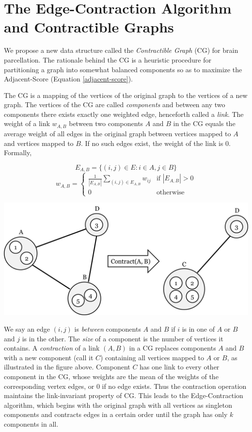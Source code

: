 \section{The Edge-Contraction Algorithm and Contractible Graphs}

We propose a new data structure called the \textit{Contractible Graph}
(CG) for brain parcellation. The rationale behind the CG is a heuristic
procedure for partitioning a graph into somewhat balanced components
so as to maximize the Adjacent-Score (Equation \ref{adjacent-score}).

The CG is a mapping of the vertices of the original graph to the
vertices of a new graph. The vertices of the CG are called
\textit{components} and between any two components there exists exactly
one weighted edge, henceforth called a \textit{link}. The weight
of a link $w_{A,B}$ between two components $A$ and $B$ in the CG equals
the average weight of all edges in the original graph between vertices
mapped to $A$ and vertices mapped to $B$. If no such edges exist,
the weight of the link is $0$. Formally,

\[ E_{A,B} = \{(i, j) \in E : i \in A, j \in B\} \]
\[ w_{A,B} = \begin{cases}
    \frac{1}{|E_{A,B}|} \sum_{(i,j) \in E_{A,B}} w_{ij} &
        \text{if } |E_{A,B}| > 0 \\
    0 & \text{otherwise}
\end{cases} \]

\includegraphics[scale = 0.55]{figs/4_contractible_graph}

We say an edge $(i,j)$ is \textit{between} components $A$ and $B$ if
$i$ is in one of $A$ or $B$ and $j$ is in the other. The \textit{size}
of a component is the number of vertices it contains.
A \textit{contraction} of a link $(A,B)$ in a CG replaces components
$A$ and $B$ with a new component (call it $C$) containing all vertices
mapped to $A$ or $B$, as illustrated in the figure above.
Component $C$ has one link to every other component in the CG, whose
weights are the mean of the weights of the corresponding vertex edges,
or $0$ if no edge exists. Thus the contraction operation maintains the
link-invariant property of CG. This leads to the Edge-Contraction
algorithm, which begins with the original graph with all vertices as
singleton components and contracts edges in a certain order until the
graph has only $k$ components in all.


